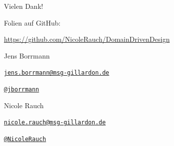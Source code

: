 {
\begin{frame}{Vielen Dank!}

        Folien auf GitHub:
        \vspace{-0.8em}
        \begin{center}
                \url{https://github.com/NicoleRauch/DomainDrivenDesign}
        \end{center}

        \begin{block}{Jens Borrmann}
        \begin{description}[Twitterxx]
                \item[E-Mail]  \href{mailto:jens.borrmann@msg-gillardon.de}{\texttt{jens.borrmann@msg-gillardon.de}}
                \item[Twitter] \href{http://twitter.com/jborrmann}{\texttt{@jborrmann}}
        \end{description}
        \end{block}
        \begin{block}{Nicole Rauch}
        \begin{description}[Twitterxx]
                \item[E-Mail]  \href{mailto:nicole.rauch@msg-gillardon.de}{\texttt{nicole.rauch@msg-gillardon.de}}
                \item[Twitter] \href{http://twitter.com/NicoleRauch}{\texttt{@NicoleRauch}}
        \end{description}
        \end{block}
\end{frame}
}
